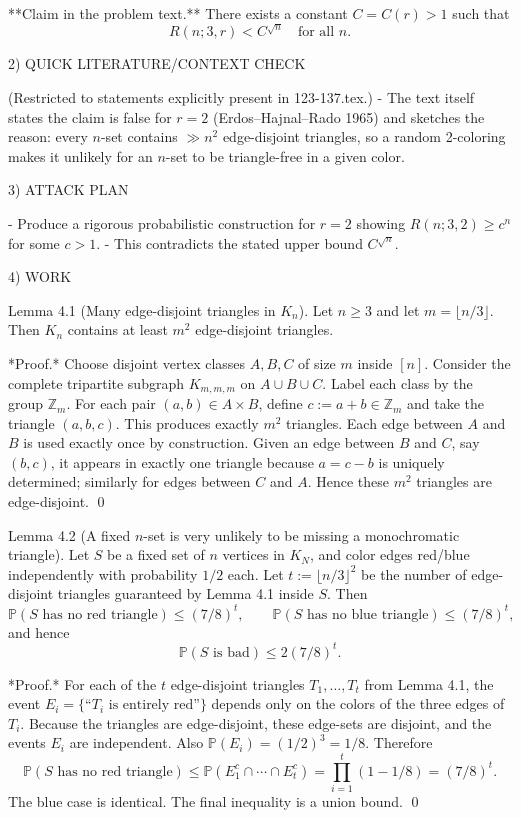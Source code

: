 **Claim in the problem text.** There exists a constant $C=C(r)>1$ such that
\[
R(n;3,r) < C^{\sqrt{n}}\quad\text{for all }n.
\]

2) QUICK LITERATURE/CONTEXT CHECK

(Restricted to statements explicitly present in 123-137.tex.)
- The text itself states the claim is false for $r=2$ (Erdos--Hajnal--Rado 1965) and sketches the reason: every $n$-set contains $\gg n^2$ edge-disjoint triangles, so a random 2-coloring makes it unlikely for an $n$-set to be triangle-free in a given color.

3) ATTACK PLAN

- Produce a rigorous probabilistic construction for $r=2$ showing $R(n;3,2)\ge c^n$ for some $c>1$.
- This contradicts the stated upper bound $C^{\sqrt{n}}$.

4) WORK

Lemma 4.1 (Many edge-disjoint triangles in $K_n$).
Let $n\ge 3$ and let $m=\lfloor n/3\rfloor$.
Then $K_n$ contains at least $m^2$ edge-disjoint triangles.

*Proof.* Choose disjoint vertex classes $A,B,C$ of size $m$ inside $[n]$.
Consider the complete tripartite subgraph $K_{m,m,m}$ on $A\cup B\cup C$.
Label each class by the group $\mathbb{Z}_m$.
For each pair $(a,b)\in A\times B$, define $c:=a+b\in \mathbb{Z}_m$ and take the triangle $(a,b,c)$.
This produces exactly $m^2$ triangles.
Each edge between $A$ and $B$ is used exactly once by construction.
Given an edge between $B$ and $C$, say $(b,c)$, it appears in exactly one triangle because $a=c-b$ is uniquely determined; similarly for edges between $C$ and $A$.
Hence these $m^2$ triangles are edge-disjoint. \qed

Lemma 4.2 (A fixed $n$-set is very unlikely to be missing a monochromatic triangle).
Let $S$ be a fixed set of $n$ vertices in $K_N$, and color edges red/blue independently with probability $1/2$ each.
Let $t:=\lfloor n/3\rfloor^2$ be the number of edge-disjoint triangles guaranteed by Lemma 4.1 inside $S$.
Then
\[
\mathbb{P}(S\text{ has no red triangle}) \le (7/8)^t,
\qquad
\mathbb{P}(S\text{ has no blue triangle}) \le (7/8)^t,
\]
and hence
\[
\mathbb{P}(S\text{ is bad}) \le 2(7/8)^t.
\]

*Proof.*
For each of the $t$ edge-disjoint triangles $T_1,\dots,T_t$ from Lemma 4.1, the event
$E_i=\{\text{``$T_i$ is entirely red''}\}$ depends only on the colors of the three edges of $T_i$.
Because the triangles are edge-disjoint, these edge-sets are disjoint, and the events $E_i$ are independent.
Also $\mathbb{P}(E_i)=(1/2)^3=1/8$.
Therefore
\[
\mathbb{P}(S\text{ has no red triangle}) \le \mathbb{P}(E_1^c\cap\cdots\cap E_t^c)
= \prod_{i=1}^t (1-1/8) = (7/8)^t.
\]
The blue case is identical. The final inequality is a union bound.
\qed

